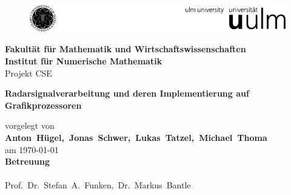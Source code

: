 
\begin{titlepage}
	\begin{figure}[h]
		\includegraphics[width=\textwidth]{images/unilogoA4}
	\end{figure}
	\vspace{1cm}
\begin{center}
{\large \bfseries Fakultät für Mathematik und Wirtschaftswissenschaften \\
\vspace{0.3cm}
\bfseries Institut für Numerische Mathematik \\
}
\vspace{2cm}
{\Large
Projekt CSE\\}

\vspace{2cm}
{\LARGE\bfseries
Radarsignalverarbeitung und deren Implementierung auf Grafikprozessoren\\
}
\end{center}

%
\vspace{3.5cm}
%
\begin{center}

vorgelegt von \\
\vspace{0.2cm}
{\bfseries\mbox{Anton Hügel, Jonas Schwer, Lukas Tatzel, Michael Thoma}} \\
\vspace{0.2cm}
am \mbox{\today} \\

\vspace*{1.2cm}
{\bfseries Betreuung} \\
\mbox{}\\
\mbox{Prof. Dr. Stefan A. Funken, Dr. Markus Bantle} \\
\end{center}
\vfill
\end{titlepage}
